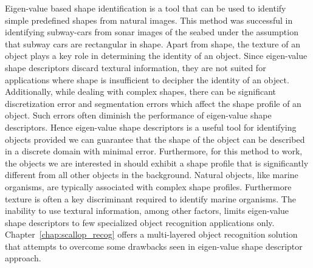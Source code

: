 \documentclass {udthesis}
\begin{document}
Eigen-value based shape identification is a tool that can be used to identify simple predefined shapes from natural images. This method was successful in identifying subway-cars from sonar images of the seabed under the assumption that subway cars are rectangular in shape. Apart from shape, the texture of an object plays a key role in determining the identity of an object. Since eigen-value shape descriptors discard textural information, they are not suited for applications where shape is insufficient to decipher the identity of an object. Additionally, while dealing with complex shapes, there can be significant discretization error and segmentation errors which affect the shape profile of an object. Such errors often diminish the performance of eigen-value shape descriptors. Hence eigen-value shape descriptors is a useful tool for identifying objects provided we can guarantee that the shape of the object can be described in a discrete domain with minimal error. Furthermore, for this method to work, the 
objects we are interested in should exhibit a shape profile that is significantly different from all other objects in the background. Natural objects, like marine organisms, are typically associated with complex shape profiles. Furthermore texture is often a key discriminant required to identify marine organisms. The inability to use textural information, among other factors, limits eigen-value shape descriptors to few specialized object recognition applications only. Chapter~\ref{chap:scallop_recog} offers a multi-layered object recognition solution that attempts to overcome some drawbacks seen in eigen-value shape descriptor approach.

\printglossary[type=\acronymtype]                  
\end{document}

